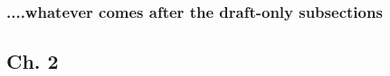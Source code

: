 


\subsubsection{....whatever comes after the draft-only subsections}














\subsection{Ch. 2}



